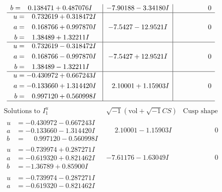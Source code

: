 \documentclass[1p]{elsarticle_modified}
\theoremstyle{definition}
\newcommand{\I}{\sqrt{-1}}
\begin{document}
$$\begin{array}{c|c|c}
\begin{aligned}
b &= \phantom{-}0.138471 + 0.487076 I\end{aligned}
 & -7.90188 - 3.34180 I & \phantom{-0.000000 } 0 \\ \hline\begin{aligned}
u &= \phantom{-}0.732619 + 0.318472 I \\
a &= \phantom{-}0.168766 + 0.997870 I \\
b &= \phantom{-}1.38489 + 1.32211 I\end{aligned}
 & -7.5427 - 12.9521 I & \phantom{-0.000000 } 0 \\ \hline\begin{aligned}
u &= \phantom{-}0.732619 - 0.318472 I \\
a &= \phantom{-}0.168766 - 0.997870 I \\
b &= \phantom{-}1.38489 - 1.32211 I\end{aligned}
 & -7.5427 + 12.9521 I & \phantom{-0.000000 } 0 \\ \hline\begin{aligned}
u &= -0.430972 + 0.667243 I \\
a &= -0.133660 + 1.314420 I \\
b &= \phantom{-}0.997120 + 0.560998 I\end{aligned}
 & \phantom{-}2.10001 + 1.15903 I & \phantom{-0.000000 } 0\\
 \hline 
 \end{array}$$\newpage$$\begin{array}{c|c|c}  
\text{Solutions to }I^u_{1}& \I (\text{vol} + \sqrt{-1}CS) & \text{Cusp shape}\\
 \hline 
\begin{aligned}
u &= -0.430972 - 0.667243 I \\
a &= -0.133660 - 1.314420 I \\
b &= \phantom{-}0.997120 - 0.560998 I\end{aligned}
 & \phantom{-}2.10001 - 1.15903 I & \phantom{-0.000000 } 0 \\ \hline\begin{aligned}
u &= -0.739974 + 0.287271 I \\
a &= -0.619320 + 0.821462 I \\
b &= -1.36789 + 0.85900 I\end{aligned}
 & -7.61176 - 1.63049 I & \phantom{-0.000000 } 0 \\ \hline\begin{aligned}
u &= -0.739974 - 0.287271 I \\
a &= -0.619320 - 0.821462 I \\

\end{aligned}
\end{array}$$
\end{document}
